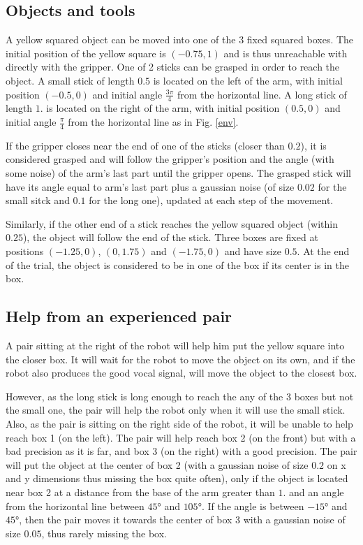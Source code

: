 \documentclass[conference]{include/IEEEtran}
\begin{document}
		
	\subsection{Objects and tools}
		
		A yellow squared object can be moved into one of the 3 fixed squared boxes. 
		The initial position of the yellow square is $(-0.75, 1)$ and is thus unreachable with directly with the gripper.
		One of 2 sticks can be grasped in order to reach the object.
		A small stick of length $0.5$ is located on the left of the arm, with initial position $(-0.5, 0)$ and initial angle $\frac{3\pi}{4}$ from the horizontal line.
		A long stick of length $1.$ is located on the right of the arm, with initial position $(0.5, 0)$ and initial angle $\frac{\pi}{4}$ from the horizontal line as in Fig. \ref{env}.
		
		If the gripper closes near the end of one of the sticks (closer than $0.2$), it is considered grasped and will follow the gripper's position and the angle (with some noise) of the arm's last part until the gripper opens.
		The grasped stick will have its angle equal to arm's last part plus a gaussian noise (of size $0.02$ for the small sitck and $0.1$ for the long one), updated at each step of the movement.
		
		Similarly, if the other end of a stick reaches the yellow squared object (within $0.25$), the object will follow the end of the stick.
		Three boxes are fixed at positions $(-1.25, 0)$, $(0, 1.75)$ and $(-1.75, 0)$ and have size $0.5$.
		At the end of the trial, the object is considered to be in one of the box if its center is in the box.
	
	
	\subsection{Help from an experienced pair}
	
		A pair sitting at the right of the robot will help him put the yellow square into the closer box.
		It will wait for the robot to move the object on its own, and if the robot also produces the good vocal signal, will move the object to the closest box.
		
		However, as the long stick is long enough to reach the any of the 3 boxes but not the small one, the pair will help the robot only when it will use the small stick.
		Also, as the pair is sitting on the right side of the robot, it will be unable to help reach box 1 (on the left).
		The pair will help reach box 2 (on the front) but with a bad precision as it is far, and box 3 (on the right) with a good precision.
		The pair will put the object at the center of box 2 (with a gaussian noise of size $0.2$ on x and y dimensions thus missing the box quite often), 
		only if the object is located near box 2 at a distance from the base of the arm greater than $1.$ and an angle from the horizontal line between $45°$ and $105°$.
		If the angle is between $-15°$ and $45°$, then the pair moves it towards the center of box 3 with a gaussian noise of size $0.05$, thus rarely missing the box.
		
\end{document}
